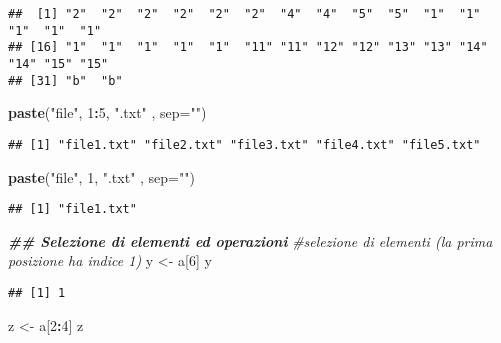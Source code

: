 \documentclass[
]{article}
\newenvironment{Shaded}{\begin{snugshade}}{\end{snugshade}}
\newcommand{\AttributeTok}[1]{\textcolor[rgb]{0.13,0.29,0.53}{#1}}
\newcommand{\CommentTok}[1]{\textcolor[rgb]{0.56,0.35,0.01}{\textit{#1}}}
\newcommand{\DecValTok}[1]{\textcolor[rgb]{0.00,0.00,0.81}{#1}}
\newcommand{\DocumentationTok}[1]{\textcolor[rgb]{0.56,0.35,0.01}{\textbf{\textit{#1}}}}
\newcommand{\FunctionTok}[1]{\textcolor[rgb]{0.13,0.29,0.53}{\textbf{#1}}}
\newcommand{\NormalTok}[1]{#1}
\newcommand{\OtherTok}[1]{\textcolor[rgb]{0.56,0.35,0.01}{#1}}
\newcommand{\SpecialCharTok}[1]{\textcolor[rgb]{0.81,0.36,0.00}{\textbf{#1}}}
\newcommand{\StringTok}[1]{\textcolor[rgb]{0.31,0.60,0.02}{#1}}
\begin{document}
\begin{verbatim}
##  [1] "2"  "2"  "2"  "2"  "2"  "2"  "4"  "4"  "5"  "5"  "1"  "1"  "1"  "1"  "1" 
## [16] "1"  "1"  "1"  "1"  "1"  "11" "11" "12" "12" "13" "13" "14" "14" "15" "15"
## [31] "b"  "b"
\end{verbatim}

\begin{Shaded}
\begin{Highlighting}[]
\FunctionTok{paste}\NormalTok{(}\StringTok{"file"}\NormalTok{, }\DecValTok{1}\SpecialCharTok{:}\DecValTok{5}\NormalTok{, }\StringTok{".txt"}\NormalTok{ , }\AttributeTok{sep=}\StringTok{""}\NormalTok{)}
\end{Highlighting}
\end{Shaded}

\begin{verbatim}
## [1] "file1.txt" "file2.txt" "file3.txt" "file4.txt" "file5.txt"
\end{verbatim}

\begin{Shaded}
\begin{Highlighting}[]
\FunctionTok{paste}\NormalTok{(}\StringTok{"file"}\NormalTok{, }\DecValTok{1}\NormalTok{, }\StringTok{".txt"}\NormalTok{ , }\AttributeTok{sep=}\StringTok{""}\NormalTok{)}
\end{Highlighting}
\end{Shaded}

\begin{verbatim}
## [1] "file1.txt"
\end{verbatim}

\begin{Shaded}
\begin{Highlighting}[]
\DocumentationTok{\#\# Selezione di elementi ed operazioni}
\CommentTok{\#selezione di elementi (la prima posizione ha indice 1)}
\NormalTok{y }\OtherTok{\textless{}{-}}\NormalTok{ a[}\DecValTok{6}\NormalTok{]        }
\NormalTok{y}
\end{Highlighting}
\end{Shaded}

\begin{verbatim}
## [1] 1
\end{verbatim}

\begin{Shaded}
\begin{Highlighting}[]
\NormalTok{z }\OtherTok{\textless{}{-}}\NormalTok{ a[}\DecValTok{2}\SpecialCharTok{:}\DecValTok{4}\NormalTok{]      }
\NormalTok{z}
\end{Highlighting}
\end{Shaded}
\end{document}
